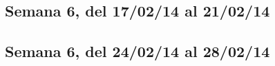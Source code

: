 \documentclass[11pt,oneside,titlepage]{article}
\begin{document}
\subsection*{Semana 6, del 17/02/14 al 21/02/14}
\begin{comment}
lunes 
- Se adquirio el cable, se connecto pero no funciono. Se revisa si los
módulos estan compilados.  
-  Estudiar la posibilidad de crear un driver.  
- Se manda correo a lista-usb. Espera de respuesta.

martes -  No es posible conectar el cable usb entre PC. El hardware USB que
traen los PCI no es soportado por el driver linux gadget que es el encargado de
realizar esta conexión, 
- Hemos descartado la posibilidad de conectar PC to PC
con un cable simple.  Decidimos realizar la conexión a través de ethernet.

miercoles 
- NAAAAAAAAAAAAADAAAAAAAAAAAAAAA 

jueves 
- NNNNNNNNNNNNAAAAAAAAAAAADAAAAAAAaaaa 
viernes 
- NAAAAAAAAAAAAAAAADAAAAAAAAAAAa

\end{comment}

\subsection*{Semana 6, del 24/02/14 al 28/02/14}
\begin{comment}

lunes
- Se decide por comprar la tarjeta desarrollo USB33880 , Claudio Torres no
escucha nuestras advertencias de que hay que realiar el driver completamente y
aún asi decide comprarla. Francisco nos pide que le mandemos el valor para que
la Universidad realice la compra, el producto no es disponible. Mantemos al
tanto a Torres sobre el problema, no sabemos que hacer.  Por mientras cada uno
hace lo suyo.
-  

lunes
\end{comment}
\end{document}
